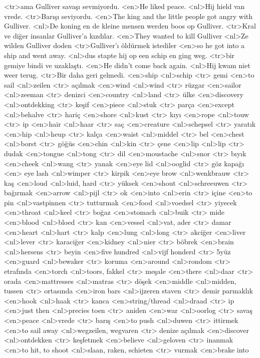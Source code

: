 <tr>ama Gulliver savaşı sevmiyordu.
<en>He liked peace.
<nl>Hij hield van vrede.
<tr>Barışı seviyordu.
<en>The king and the little people got angry with Gulliver.
<nl>De koning en de kleine mensen werden boos op Gulliver.
<tr>Kral ve diğer insanlar Gulliver’a kızdılar.
<en>They wanted to kill Gulliver
<nl>Ze wilden Gulliver doden
<tr>Gulliver’ı öldürmek istediler
<en>so he got into a ship and went away.
<nl>dus stapte hij op een schip  en ging weg.
<tr>bir gemiye bindi ve uzaklaştı.
<en>He didn’t come back again.
<nl>Hij kwam niet weer terug.
<tr>Bir daha geri gelmedi.
<en>ship 
<nl>schip 
<tr> gemi
<en>to sail 
<nl>zeilen 
<tr> açılmak
<en>wind 
<nl>wind 
<tr> rüzgar
<en>sailor 
<nl>zeeman 
<tr> denizci
<en>country 
<nl>land 
<tr> ülke
<en>discovery 
<nl>ontdekking
<tr> keşif
<en>piece 
<nl>stuk
<tr> parça
<en>except 
<nl>behalve
<tr> hariç
<en>shore 
<nl>kust
<tr> kıyı
<en>rope 
<nl>touw
<tr> ip
<en>hair 
<nl>haar
<tr> saç
<en>creature 
<nl>schepsel
<tr> yaratık
<en>hip 
<nl>heup
<tr> kalça
<en>waist 
<nl>middel
<tr> bel
<en>chest 
<nl>borst
<tr> göğüs
<en>chin 
<nl>kin
<tr> çene
<en>lip 
<nl>lip
<tr> dudak
<en>tongue 
<nl>tong
<tr> dil
<en>moustache 
<nl>snor
<tr> bıyık
<en>cheek 
<nl>wang
<tr> yanak
<en>eye lid 
<nl>ooglid
<tr> göz kapağı
<en> eye lash 
<nl>wimper
<tr> kirpik
<en>eye brow 
<nl>wenkbrauw
<tr> kaş
<en>loud 
<nl>luid, hard
<tr> yüksek
<en>shout 
<nl>schreeuwen
<tr> bağırmak
<en>arrow 
<nl>pijl
<tr> ok
<en>into 
<nl>erin
<tr> içine
<en>to pin 
<nl>vastpinnen
<tr> tutturmak
<en>food 
<nl>voedsel
<tr> yiyecek
<en>throat 
<nl>keel
<tr> boğaz
<en>stomach 
<nl>buik
<tr> mide
<en>blood 
<nl>bloed
<tr> kan
<en>vessel 
<nl>vat, ader
<tr> damar
<en>heart 
<nl>hart
<tr> kalp
<en>lung 
<nl>long
<tr> akciğer
<en>liver 
<nl>lever
<tr> karaciğer
<en>kidney 
<nl>nier
<tr> böbrek
<en>brain 
<nl>hersens
<tr> beyin
<en>five hundred 
<nl>vijf honderd
<tr> 5yüz
<en>guard 
<nl>bewaker
<tr> koruma
<en>around 
<nl>rondom
<tr> etrafında
<en>torch 
<nl>toors, fakkel
<tr> meşale
<en>there 
<nl>daar
<tr> orada
<en>mattresses 
<nl>matras
<tr> döşek
<en>middle 
<nl>midden, tussen
<tr> ortasında
<en>iron bars 
<nl>ijzeren staven
<tr> demir parmaklık
<en>hook 
<nl>haak
<tr> kanca
<en>string/thread 
<nl>draad
<tr> ip
<en>just then 
<nl>precies toen
<tr> aniden
<en>war 
<nl>oorlog
<tr> savaş
<en>peace 
<nl>vrede
<tr> barış
<en>to push 
<nl>duwen
<tr> ittirmek
<en>to sail away 
<nl>wegzeilen, wegvaren
<tr> denize açılmak
<en>discover 
<nl>ontdekken
<tr> keşfetmek
<en>believe 
<nl>geloven
<tr> inanmak
<en>to hit, to shoot 
<nl>slaan, raken, schieten
<tr> vurmak
<en>brake into 

